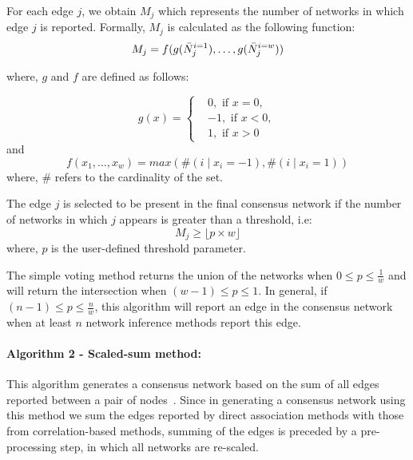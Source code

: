  For each edge $j$, we obtain $M_j$ which represents the number of networks in which edge $j$ is reported.
 Formally, $M_j$ is calculated as the following function:
  \begin{equation}
      M_j = f(g(\bar{N}^{i=1}_j), \dots, g(\bar{N}^{i=w}_j)) \\
    \label{eq:simple-voting}
  \end{equation}

where, $g$ and $f$ are defined as follows:

  \begin{equation*}
    g(x) =
    \begin{cases}
       & 0, \text{ if } x=0, \\
       & -1, \text{ if } x<0, \\
       & 1, \text{ if } x>0
    \end{cases}
  \end{equation*}
  and
  \begin{equation*}
    f(x_1,\dots,x_w) = max \left( \#(i \mid x_i=-1),\#(i \mid x_i=1)
       \right)
  \end{equation*}
  where, $\#$ refers to the cardinality of the set.

 The edge $j$ is selected to be present in the final consensus network if the number of networks in which $j$ appears is greater than a threshold, i.e:
  \begin{equation}
     M_j \geq \lfloor p \times w \rfloor
    \label{eqn:simple-voting2}
  \end{equation}
  where, $p$ is the user-defined threshold parameter.

  The simple voting method returns the union of the networks when $0 \leq p \leq \frac{1}{w}$ and will return the intersection when $(w - 1) \leq p \leq 1$.
  In general, if $(n - 1) \leq p \leq \frac{n}{w}$, this algorithm will report an edge in the consensus network when at least $n$ network inference methods report this edge.


  \paragraph*{Algorithm 2 - Scaled-sum method:}

  This algorithm generates a consensus network based on the sum of all edges reported between a pair of nodes~\cite{bustinceFuzzySetsTheir2008,tsarevApplicationMajorityVoting2018}.
  Since in generating a consensus network using this method we sum the edges reported by direct association methods with those from correlation-based methods, summing of the edges is preceded by a pre-processing step, in which all networks are re-scaled.

